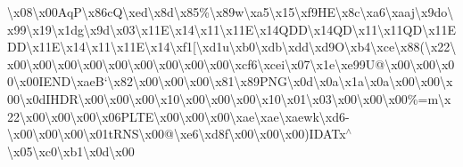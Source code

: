 \textbackslash{}x08\textbackslash{}x00\+Aq\+P\textbackslash{}x86c\+Q\textbackslash{}xed\textbackslash{}x8d\textbackslash{}x85\%\textbackslash{}x89w\textbackslash{}xa5\textbackslash{}x15\textbackslash{}xf9\+H\+E\textbackslash{}x8c\textbackslash{}xa6\textbackslash{}xaaj\textbackslash{}x9do\textbackslash{}x99\textbackslash{}x19\textbackslash{}x1dg\textbackslash{}x9d\textbackslash{}x03\textbackslash{}x11\+E\textbackslash{}x14\textbackslash{}x11\textbackslash{}x11\+E\textbackslash{}x14\+Q\+D\+D\textbackslash{}x14\+Q\+D\textbackslash{}x11\textbackslash{}x11\+Q\+D\textbackslash{}x11\+E\+D\+D\textbackslash{}x11\+E\textbackslash{}x14\textbackslash{}x11\textbackslash{}x11\+E\textbackslash{}x14\textbackslash{}xf1\mbox{[}\textbackslash{}xd1u\textbackslash{}xb0\textbackslash{}xdb\textbackslash{}xdd\textbackslash{}xd9\+O\textbackslash{}xb4\textbackslash{}xce\textbackslash{}x88(\textbackslash{}x22\textbackslash{}x00\textbackslash{}x00\textbackslash{}x00\textbackslash{}x00\textbackslash{}x00\textbackslash{}x00\textbackslash{}x00\textbackslash{}x00\textbackslash{}x00\textbackslash{}xcf6\textbackslash{}xcei\textbackslash{}x07\textbackslash{}x1e\textbackslash{}xe99\+U@\textbackslash{}x00\textbackslash{}x00\textbackslash{}x00\textbackslash{}x00\+I\+E\+N\+D\textbackslash{}xae\+B`\textbackslash{}x82\textbackslash{}x00\textbackslash{}x00\textbackslash{}x00\textbackslash{}x81\textbackslash{}x89\+P\+N\+G\textbackslash{}x0d\textbackslash{}x0a\textbackslash{}x1a\textbackslash{}x0a\textbackslash{}x00\textbackslash{}x00\textbackslash{}x00\textbackslash{}x0d\+I\+H\+D\+R\textbackslash{}x00\textbackslash{}x00\textbackslash{}x00\textbackslash{}x10\textbackslash{}x00\textbackslash{}x00\textbackslash{}x00\textbackslash{}x10\textbackslash{}x01\textbackslash{}x03\textbackslash{}x00\textbackslash{}x00\textbackslash{}x00\%=m\textbackslash{}x22\textbackslash{}x00\textbackslash{}x00\textbackslash{}x00\textbackslash{}x06\+P\+L\+T\+E\textbackslash{}x00\textbackslash{}x00\textbackslash{}x00\textbackslash{}xae\textbackslash{}xae\textbackslash{}xaewk\textbackslash{}xd6-\/\textbackslash{}x00\textbackslash{}x00\textbackslash{}x00\textbackslash{}x01t\+R\+N\+S\textbackslash{}x00@\textbackslash{}xe6\textbackslash{}xd8f\textbackslash{}x00\textbackslash{}x00\textbackslash{}x00)\+I\+D\+A\+Tx$^\wedge$\textbackslash{}x05\textbackslash{}xc0\textbackslash{}xb1\textbackslash{}x0d\textbackslash{}x00 